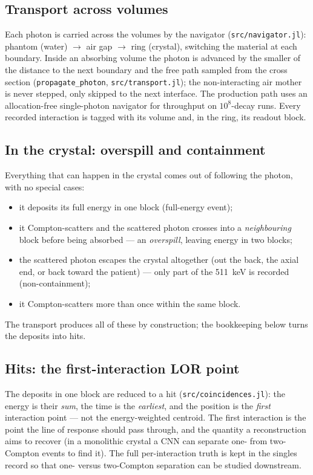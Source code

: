 \documentclass[11pt]{article}
\begin{document}
\subsection{Transport across volumes}
Each photon is carried across the volumes by the navigator (\texttt{src/navigator.jl}):
phantom (water) $\to$ air gap $\to$ ring (crystal), switching the material at each boundary.
Inside an absorbing volume the photon is advanced by the smaller of the distance to the next
boundary and the free path sampled from the cross section
(\texttt{propagate\_photon}, \texttt{src/transport.jl}); the non-interacting air mother is
never stepped, only skipped to the next interface. The production path uses an
allocation-free single-photon navigator for throughput on $10^{8}$-decay runs. Every
recorded interaction is tagged with its volume and, in the ring, its readout block.

\subsection{In the crystal: overspill and containment}
Everything that can happen in the crystal comes out of following the photon, with no special
cases:
\begin{itemize}[nosep]
\item it deposits its full energy in one block (full-energy event);
\item it Compton-scatters and the scattered photon crosses into a \emph{neighbouring} block
before being absorbed --- an \emph{overspill}, leaving energy in two blocks;
\item the scattered photon escapes the crystal altogether (out the back, the axial end, or
back toward the patient) --- only part of the \SI{511}{keV} is recorded (non-containment);
\item it Compton-scatters more than once within the same block.
\end{itemize}
The transport produces all of these by construction; the bookkeeping below turns the
deposits into hits.

\subsection{Hits: the first-interaction LOR point}
The deposits in one block are reduced to a hit (\texttt{src/coincidences.jl}): the energy is
their \emph{sum}, the time is the \emph{earliest}, and the position is the \emph{first}
interaction point --- not the energy-weighted centroid. The first interaction is the point
the line of response should pass through, and the quantity a reconstruction aims to recover
(in a monolithic crystal a CNN can separate one- from two-Compton events to find it). The
full per-interaction truth is kept in the singles record so that one- versus two-Compton
separation can be studied downstream.
\end{document}
